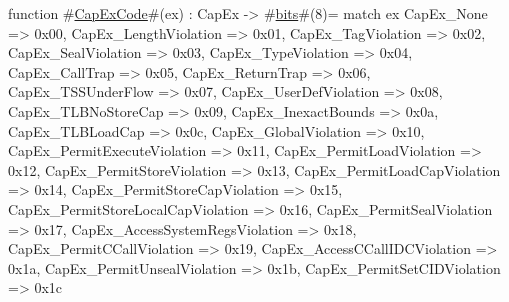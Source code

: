 function #\hyperref[sailMIPSzCapExCode]{CapExCode}#(ex) : CapEx -> #\hyperref[sailMIPSzbits]{bits}#(8)=
  match ex {
    CapEx_None                          => 0x00,
    CapEx_LengthViolation               => 0x01,
    CapEx_TagViolation                  => 0x02,
    CapEx_SealViolation                 => 0x03,
    CapEx_TypeViolation                 => 0x04,
    CapEx_CallTrap                      => 0x05,
    CapEx_ReturnTrap                    => 0x06,
    CapEx_TSSUnderFlow                  => 0x07,
    CapEx_UserDefViolation              => 0x08,
    CapEx_TLBNoStoreCap                 => 0x09,
    CapEx_InexactBounds                 => 0x0a,
    CapEx_TLBLoadCap                    => 0x0c,
    CapEx_GlobalViolation               => 0x10,
    CapEx_PermitExecuteViolation        => 0x11,
    CapEx_PermitLoadViolation           => 0x12,
    CapEx_PermitStoreViolation          => 0x13,
    CapEx_PermitLoadCapViolation        => 0x14,
    CapEx_PermitStoreCapViolation       => 0x15,
    CapEx_PermitStoreLocalCapViolation  => 0x16,
    CapEx_PermitSealViolation           => 0x17,
    CapEx_AccessSystemRegsViolation     => 0x18,
    CapEx_PermitCCallViolation          => 0x19,
    CapEx_AccessCCallIDCViolation       => 0x1a,
    CapEx_PermitUnsealViolation         => 0x1b,
    CapEx_PermitSetCIDViolation         => 0x1c
  }
